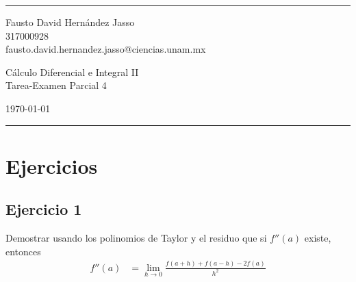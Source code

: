 \documentclass[a4paper]{article}
\begin{document}

\fancyhead[C]{}
\hrule \medskip %
\begin{minipage}{0.35\textwidth} 
\raggedright
\footnotesize
Fausto David Hernández Jasso \hfill\\   
317000928 \hfill\\
fausto.david.hernandez.jasso@ciencias.unam.mx
\end{minipage}
\begin{minipage}{0.4\textwidth} 
\centering 
\large 
Cálculo Diferencial e Integral II\\ 
\normalsize 
Tarea-Examen Parcial 4\\ 
\end{minipage}
\begin{minipage}{0.24\textwidth} 
\raggedleft
\today\hfill\\
\end{minipage}
\medskip\hrule 
\bigskip
\section{Ejercicios}
\subsection{Ejercicio 1}
\noindent
Demostrar usando los polinomios de Taylor y el residuo que si \(f''(a)\) existe, entonces
\begin{align*}
    f''(a) &= \lim_{h \to 0} \frac{f(a + h) + f(a - h) -2f(a)}{h^2}
\end{align*}
\end{document}
